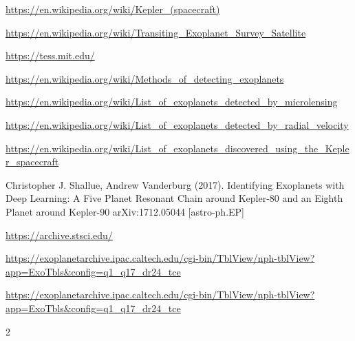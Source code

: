 \documentclass[twoside]{article}
\begin{document}
\begin{multicols}{2}
\begin{thebibliography}{99}
\url{https://en.wikipedia.org/wiki/Kepler_(spacecraft)}

\url{https://en.wikipedia.org/wiki/Transiting_Exoplanet_Survey_Satellite}

\url{https://tess.mit.edu/}

\url{https://en.wikipedia.org/wiki/Methods_of_detecting_exoplanets}

\url{https://en.wikipedia.org/wiki/List_of_exoplanets_detected_by_microlensing}

\url{https://en.wikipedia.org/wiki/List_of_exoplanets_detected_by_radial_velocity}

\url{https://en.wikipedia.org/wiki/List_of_exoplanets_discovered_using_the_Kepler_spacecraft}

Christopher J. Shallue, Andrew Vanderburg (2017).
\newblock Identifying Exoplanets with Deep Learning: A Five Planet Resonant Chain around Kepler-80 and an Eighth Planet around Kepler-90
\newblock arXiv:1712.05044 [astro-ph.EP]

\url{https://archive.stsci.edu/}

\url{https://exoplanetarchive.ipac.caltech.edu/cgi-bin/TblView/nph-tblView?app=ExoTbls&config=q1_q17_dr24_tce}

\url{https://exoplanetarchive.ipac.caltech.edu/cgi-bin/TblView/nph-tblView?app=ExoTbls&config=q1_q17_dr24_tce}
 
\end{thebibliography}


\end{multicols}{2}
\end{document}
